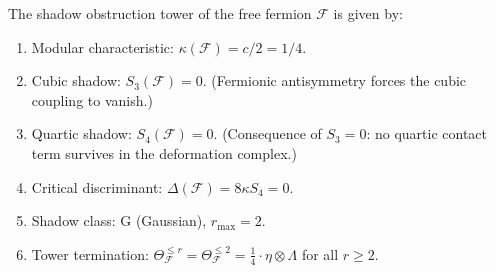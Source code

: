 \begin{proposition}
\label{prop:fermion-shadow-invariants}
The shadow obstruction tower of the free fermion
$\mathcal{F}$ is given by:
\begin{enumerate}
\item\label{item:fermion-kappa}
 Modular characteristic:
 $\kappa(\mathcal{F}) = c/2 = 1/4$.
\item\label{item:fermion-S3}
 Cubic shadow:
 $S_3(\mathcal{F}) = 0$.
 \textup{(}Fermionic antisymmetry forces the cubic coupling to vanish.\textup{)}
\item\label{item:fermion-S4}
 Quartic shadow:
 $S_4(\mathcal{F}) = 0$.
 \textup{(}Consequence of $S_3 = 0$: no quartic contact term survives in the
 deformation complex.\textup{)}
\item\label{item:fermion-discriminant}
 Critical discriminant:
 $\Delta(\mathcal{F}) = 8\kappa S_4 = 0$.
\item\label{item:fermion-class}
 Shadow class: G \textup{(}Gaussian\textup{)}, $r_{\max} = 2$.
\item\label{item:fermion-tower}
 Tower termination:
 $\Theta_{\mathcal{F}}^{\leq r}
 = \Theta_{\mathcal{F}}^{\leq 2}
 = \tfrac{1}{4} \cdot \eta \otimes \Lambda$
 for all $r \geq 2$.
\end{enumerate}
\end{proposition}


